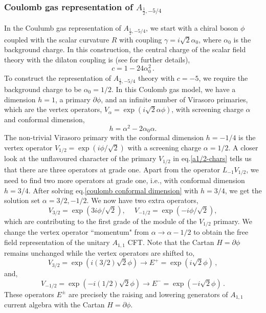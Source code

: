 \documentclass[a4paper,12pt]{article}
\begin{document}
\subsubsection*{Coulomb gas representation of \ensuremath{A_{\frac{1}{2},-5/4}}}

In the Coulumb gas representation of $A_{\frac{1}{2},-5/4}$, we start with a chiral boson $\phi$ coupled with the scalar curvature $R$ with coupling $\gamma=i\sqrt{2}\alpha_0$, where $\alpha_0$ is the background charge. In this construction, the central charge of the scalar field theory with the dilaton coupling is (see \cite{DiFrancesco:1997nk} for further details),
%
\begin{equation}
    c = 1-24\alpha_0^2\, .
\end{equation}
%
To construct the representation of $A_{\frac{1}{2},-5/4}$ theory with $c=-5$, we require the background charge to be $\alpha_0 = 1/2$. In this Coulomb gas model, we have a dimension $h=1$, a primary $\partial \phi$, and an infinite number of Virasoro primaries, which are the vertex operators, $V_{\alpha} = \exp(i\sqrt{2}\alpha\phi)$, with screening charge $\alpha$ and conformal dimension,
%
\begin{equation}\label{coulomb conformal dimension}
    h= \alpha^2 - 2\alpha_0\alpha.
\end{equation}
%
The non-trivial Virasoro primary with the conformal dimension $h=-1/4$ is the vertex operator $V_{1/2} = \exp(i\phi/\sqrt{2})$ with a screening charge $\alpha = 1/2$. A closer look at the unflavoured character of the primary $V_{1/2}$ in eq.\eqref{a1/2-chars} tells us that there are three operators at grade one. Apart from the operator $L_{-1}V_{1/2}$, we need to find two more operators at grade one, i.e., with conformal dimension $h=3/4$. After solving eq.\eqref{coulomb conformal dimension} with $h=3/4$, we get the solution set $\alpha = 3/2, -1/2$. We now have two extra operators,
%
\begin{equation}
    V_{3/2} = \exp(3i\phi/\sqrt{2}),\ \quad
V_{-1/2} = \exp(-i\phi/\sqrt{2}),
\end{equation}
%
 which are contributing to the first grade of the module of the $V_{1/2}$ primary. We change the vertex operator “momentum" from $\alpha\to\alpha-1/2$ to obtain the free field representation of the unitary $A_{1,1}$ CFT. Note that the Cartan $H=\partial\phi$ remains unchanged while the vertex operators are shifted to,
\begin{equation}
  V_{3/2} = \exp(i(3/2)\sqrt{2}\phi)  \to E^{+}=\exp(i\sqrt{2}\phi)\, ,
\end{equation}
and,
\begin{equation}
V_{-1/2} = \exp(-i(1/2)\sqrt{2}\phi) \to E^{-}=\exp(-i\sqrt{2}\phi)\, .
\end{equation}
These operators $E^{\pm}$ are precisely the raising and lowering generators of $A_{1,1}$ current algebra with the Cartan $H=\partial\phi$.
\end{document}
